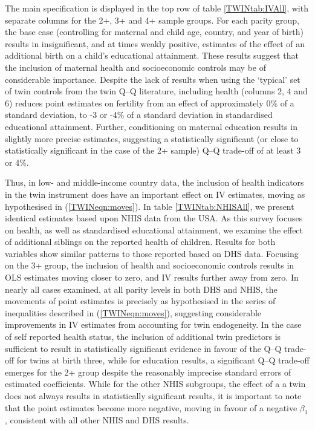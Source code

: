\documentclass[subeqn]{article}
\begin{document}
\begin{spacing}{1.4}
The main specification is displayed in the top row of table \ref{TWINtab:IVAll}, 
with separate columns for the 2+, 3+ and 4+ sample groups. For each parity 
group, the base case (controlling for maternal and child age, country, and year 
of birth) results in insignificant, and at times weakly positive, estimates of 
the effect of an additional birth on a child's educational attainment. These 
results suggest that the inclusion of maternal health and socioeconomic controls 
may be of considerable importance. Despite the lack of results when using
the `typical' set of twin controls from the twin Q--Q literature, including 
health (columns 2, 4 and 6) reduces point estimates on fertility from an effect 
of approximately 0\% of a standard deviation, to -3 or -4\% of a standard 
deviation in standardised educational attainment. Further, conditioning on 
maternal education results in slightly more precise estimates, suggesting a 
statistically significant (or close to statistically significant in the case
of the 2+ sample) Q--Q trade-off of at least 3 or 4\%.

Thus, in low- and middle-income country data, the inclusion of health 
indicators in the twin instrument does have an important effect on IV 
estimates, moving as hypothesised in (\ref{TWINeqn:moves}).  In table 
\ref{TWINtab:NHISAll}, we present identical estimates based upon NHIS data from
the USA. As this survey focuses on health, as well as standardised educational 
attainment, we examine the effect of additional siblings on the reported health
of children. Results for both variables show similar patterns to those reported 
based on DHS data.  Focusing on the 3+ group, the inclusion of health and 
socioeconomic controls results in OLS estimates moving closer to zero, and IV 
results further away from zero. In nearly all cases examined, at all parity 
levels in both DHS and NHIS, the movements of point estimates is precisely as
 hypothesised in the series of inequalities described in (\ref{TWINeqn:moves}), 
suggesting considerable improvements in IV estimates from accounting for twin
endogeneity.  In the case of self reported health status, the inclusion of 
additional twin predictors is sufficient to result in statistically significant 
evidence in favour of the Q--Q trade-off for twins at birth three, while for
education results, a significant Q--Q trade-off emerges for the 2+ group despite 
the reasonably imprecise standard errors of estimated coefficients. While for 
the other NHIS subgroups, the effect of a a twin does not always results in
statistically significant results, it is important to note that the point 
estimates become more negative, moving in favour of a negative $\beta_1$, 
consistent with all other NHIS and DHS results.


\end{spacing}
\end{document}

